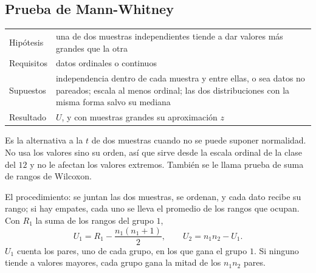 \documentclass[11pt,letterpaper]{article}
\begin{document}

\subsection*{Prueba de Mann-Whitney}

\begin{center}
\small
\begin{tabular}{l>{\raggedright\arraybackslash}p{10.5cm}}
    \toprule
    Hipótesis & una de dos muestras independientes tiende a dar valores
                más grandes que la otra \\
    Requisitos & datos ordinales o continuos \\
    Supuestos & independencia dentro de cada muestra y entre ellas,
                o sea datos no pareados; escala al menos ordinal; las
                dos distribuciones con la misma forma salvo su
                mediana \\
    Resultado & $U$, y con muestras grandes su aproximación $z$ \\
    \bottomrule
\end{tabular}
\end{center}

Es la alternativa a la $t$ de dos muestras cuando no se puede suponer
normalidad. No usa los valores sino su orden, así que sirve desde la
escala ordinal de la clase del $12$ y no le afectan los valores
extremos. También se le llama prueba de suma de rangos de Wilcoxon.

El procedimiento: se juntan las dos muestras, se ordenan, y cada dato
recibe su rango; si hay empates, cada uno se lleva el promedio de los
rangos que ocupan. Con $R_1$ la suma de los rangos del grupo $1$,
\[
    U_1 = R_1 - \frac{n_1 (n_1 + 1)}{2} ,
    \qquad
    U_2 = n_1 n_2 - U_1 .
\]
$U_1$ cuenta los pares, uno de cada grupo, en los que gana el grupo
$1$. Si ninguno tiende a valores mayores, cada grupo gana la mitad de
los $n_1 n_2$ pares.
\end{document}

